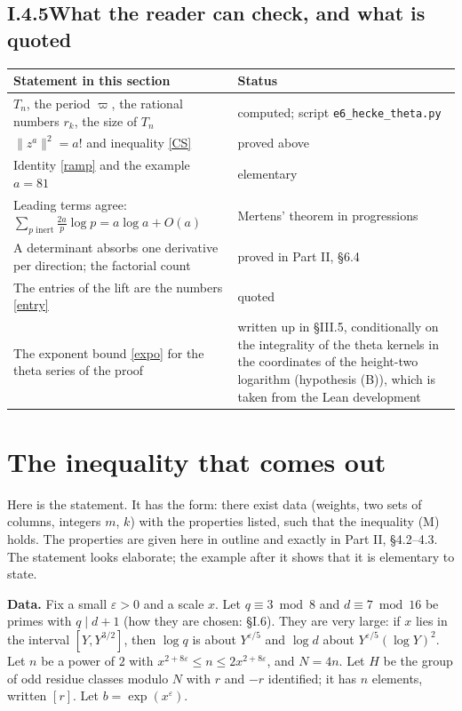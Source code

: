 \documentclass[11pt,letterpaper]{article}
\begin{document}
\subsection*{I.4.5\quad What the reader can check, and what is quoted}

\begin{center}\small
\begin{tabular}{p{}p{}}
\toprule
Statement in this section & Status\\
\midrule
$T_n$, the period $\varpi$, the rational numbers $r_k$, the size of $T_n$ & computed; script \texttt{e6\_hecke\_theta.py}\\
$\|z^a\|^2=a!$ and inequality \eqref{CS} & proved above\\
Identity \eqref{ramp} and the example $a=81$ & elementary\\
Leading terms agree: $\sum_{p\text{ inert}}\frac{2a}p\log p=a\log a+O(a)$ & Mertens' theorem in progressions\\
A determinant absorbs one derivative per direction; the factorial count & proved in Part II, \S6.4\\
The entries of the lift are the numbers \eqref{entry} & quoted\\
The exponent bound \eqref{expo} for the theta series of the proof & written up in \S III.5, conditionally on the integrality of the theta kernels in the coordinates of the height-two logarithm (hypothesis (B)), which is taken from the Lean development\\
\bottomrule
\end{tabular}
\end{center}

\section{The inequality that comes out}

Here is the statement. It has the form: there exist data (weights, two sets of columns, integers $m$, $k$)
with the properties listed, such that the inequality (M) holds. The properties are given here in outline and
exactly in Part II, \S4.2--4.3. The statement looks elaborate; the example after it shows that it is
elementary to state.

\textbf{Data.} Fix a small $\varepsilon>0$ and a scale $x$. Let $q\equiv3\bmod8$ and $d\equiv7\bmod16$ be
primes with $q\mid d+1$ (how they are chosen: \S I.6). They are very large: if $x$ lies in the interval
$[Y,Y^{3/2}]$, then $\log q$ is about $Y^{\varepsilon/5}$ and $\log d$ about $Y^{\varepsilon/5}(\log Y)^2$.
Let $n$ be a power of $2$ with $x^{2+8\varepsilon}\le n\le2x^{2+8\varepsilon}$, and $N=4n$. Let $H$ be the group of odd residue classes modulo $N$ with $r$ and $-r$ identified; it
has $n$ elements, written $[r]$. Let $b=\exp(x^\varepsilon)$.
\end{document}
